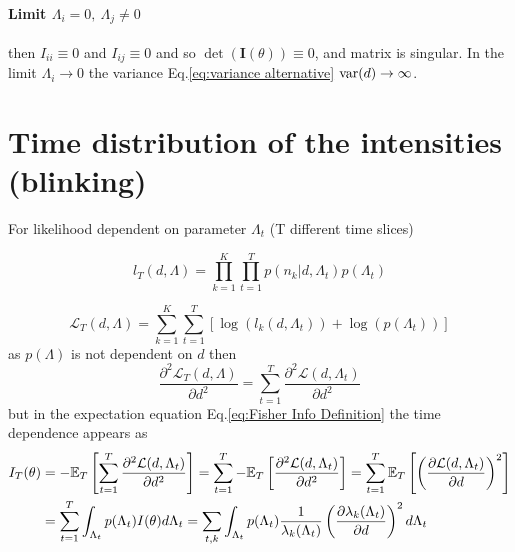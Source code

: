 \paragraph*{Limit $\Lambda_i=0,\ \Lambda_j\neq0$}
then $I_{ii}\equiv0$ and $I_{ij}\equiv0$ and so $\det(\bm{I}(\theta))\equiv0$, and matrix is singular. In the limit $\Lambda_i\rightarrow0$ the
variance Eq.\eqref{eq:variance alternative} $\mathrm{var}(d)\rightarrow\infty$. 


\section{Time distribution of the intensities (blinking)}
For likelihood dependent on parameter $\Lambda_{t}$ (T different time slices)

\begin{equation}
	l_{T}(d,\Lambda)=\prod_{k=1}^{K}\prod_{t=1}^{T}p(n_k|d,\Lambda_{t})p(\Lambda_{t})
\end{equation}

\begin{equation}
	\mathcal{L}_{T}(d,\Lambda)=\sum_{k=1}^{K}\sum_{t=1}^{T}\left[\log\left(l_k(d,\Lambda_{t})\right)+\log\left(p(\Lambda_{t})\right)\right]
\end{equation}
%
as $p(\Lambda)$ is not dependent on $d$ then
%
\begin{equation}
	\frac{\partial^2\mathcal{L}_{T}(d,\Lambda)}{\partial d^2}=\sum_{t=1}^{T}\frac{\partial^2\mathcal{L}(d,\Lambda_{t})}{\partial d^2}
\end{equation}
%
but in the expectation equation Eq.\eqref{eq:Fisher Info Definition} the time dependence appears as
%
\begin{alignat*}{1}
	I_{T}(\theta) & =-\mathbb{E}_{T}\left[\sum_{t=1}^{T}\frac{\partial^2\mathcal{L}(d,\Lambda_{t})}{\partial d^2}\right]=\sum_{t=1}^{T}-\mathbb{E}_{T}\left[\frac{\partial^2\mathcal{L}(d,\Lambda_{t})}{\partial d^2}\right]=\sum_{t=1}^{T}\mathbb{E}_{T}\left[\left(\frac{\partial\mathcal{L}(d,\Lambda_{t})}{\partial d}\right)^2\right]\\
	& =\sum_{t=1}^{T}\int_{\Lambda_{t}}p(\Lambda_{t})I(\theta)d\Lambda_{t}=\sum_{t,k}\int_{\Lambda_{t}}p(\Lambda_{t})\frac{1}{\lambda_k(\Lambda_{t})}\left(\frac{\partial\lambda_k(\Lambda_{t})}{\partial d}\right)^2d\Lambda_{t}
\end{alignat*}


